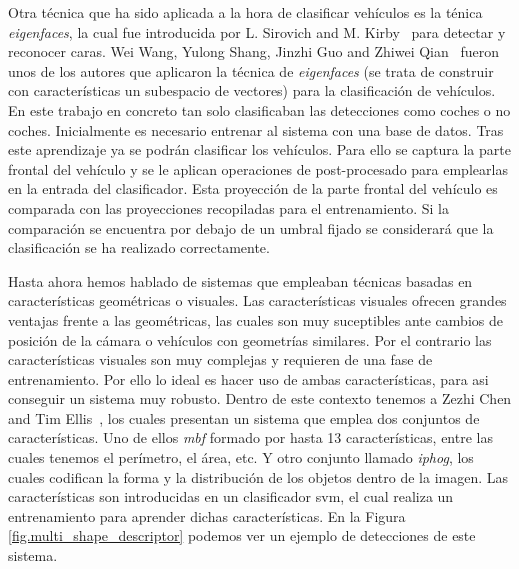 Otra técnica que ha sido aplicada a la hora de clasificar vehículos es la ténica \textit{eigenfaces}, la cual fue introducida por L. Sirovich and M. Kirby~\cite{low_dimensional} para detectar y reconocer caras. Wei Wang, Yulong Shang, Jinzhi Guo and Zhiwei Qian~\cite{real_time_vehicle} fueron unos de los autores que aplicaron la técnica de \textit{eigenfaces} (se trata de construir con características un subespacio de vectores) para la clasificación de vehículos. En este trabajo en concreto tan solo clasificaban las detecciones como coches o no coches. Inicialmente es necesario entrenar al sistema con una base de datos. Tras este aprendizaje ya se podrán clasificar los vehículos. Para ello se captura la parte frontal del vehículo y se le aplican operaciones de post-procesado para emplearlas en la entrada del clasificador. Esta proyección de la parte frontal del vehículo es comparada con las proyecciones recopiladas para el entrenamiento. Si la comparación se encuentra por debajo de un umbral fijado se considerará que la clasificación se ha realizado correctamente. 

Hasta ahora hemos hablado de sistemas que empleaban técnicas basadas en características geométricas o visuales. Las características visuales ofrecen grandes ventajas frente a las geométricas, las cuales son muy suceptibles ante cambios de posición de la cámara o vehículos con geometrías similares. Por el contrario las características visuales son muy complejas y requieren de una fase de entrenamiento. Por ello lo ideal es hacer uso de ambas características, para asi conseguir un sistema muy robusto. Dentro de este contexto tenemos a Zezhi Chen and Tim Ellis~\cite{multi_shape_descriptor}, los cuales presentan un sistema que emplea dos conjuntos de características. Uno de ellos \textit{\acrfull{mbf}} formado por hasta 13 características, entre las cuales tenemos el perímetro, el área, etc. Y otro conjunto llamado \textit{\acrfull{iphog}}, los cuales codifican la forma y la distribución de los objetos dentro de la imagen. Las características son introducidas en un clasificador \acrshort{svm}, el cual realiza un entrenamiento para aprender dichas características. En la Figura \ref{fig.multi_shape_descriptor} podemos ver un ejemplo de detecciones de este sistema.

